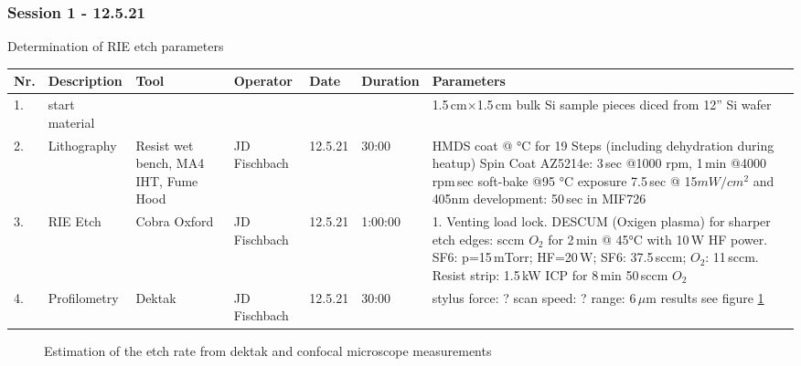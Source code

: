 \vspace{-0.1cm}   
\subsubsection*{Session 1 - 12.5.21}   
Determination of RIE etch parameters  
\vspace{-0.5cm}   
\begin{table}[H]
\footnotesize
\begin{tabular}{| p{0.4cm}| p{2.8cm}| p{2.0cm}|p{2.0cm}| p{2.0cm}| p{2.0cm}|p{13.5cm}|}
\hline
\textbf{Nr.}&\textbf{Description}  &\textbf{Tool}&\textbf{Operator}&\textbf{Date}  &\textbf{Duration}       &        \textbf{Parameters}\\ \hline\hline
1. &start material&   &   &  &  & 1.5\,cm$\times$1.5\,cm bulk Si sample pieces diced from 12'' Si wafer\\\hline
2. &Lithography& Resist wet bench, MA4 IHT, Fume Hood  & JD Fischbach & 12.5.21 & 30:00  & 
HMDS coat @ °C for 19 Steps (including dehydration during heatup)\newline
Spin Coat AZ5214e: 3\,sec @1000 rpm, 1\,min @4000 rpm\newline
90\,sec soft-bake @95 °C\newline
exposure 7.5\,sec @ 15$mW/cm^\text{2}$ and 405nm\newline
development: 50\,sec in MIF726
\\\hline
3.  &RIE Etch& Cobra Oxford  & JD Fischbach  &12.5.21 & 1:00:00  & 
1. Venting load lock\newline
2. DESCUM (Oxigen plasma) for sharper etch edges:\newline
20 sccm $O_2$ for 2\,min @ 45°C with 10\,W HF power\newline
3. SF6: p=15\,mTorr; HF=20\,W; SF6: 37.5\,sccm; $O_2$: 11\,sccm\newline
4. Resist strip: 1.5\,kW ICP for 8\,min 50\,sccm $O_2$ \\\hline
4. &Profilometry& Dektak  & JD Fischbach & 12.5.21 & 30:00  & 
stylus force: ?
scan speed: ?
range: 6\,$\mu$m
results see figure \ref{fig:cross_section}
\\\hline
\end{tabular}
\end{table}  
\vspace{-0.5cm}   

\graphicspath{{Assets}}
\begin{figure}[H]
  \centering
      \def\svgwidth{0.3\columnwidth}
      
      \caption{Estimation of the etch rate from dektak and confocal microscope measurements}
      \label{fig:cross_section}
\end{figure}